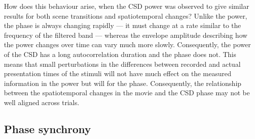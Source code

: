 How does this behaviour arise, when the \ac{CSD} power was observed to give similar results for both scene transitions and spatiotemporal changes?
Unlike the power, the phase is always changing rapidly --- it must change at a rate similar to the frequency of the filtered band --- whereas the envelope amplitude describing how the power changes over time can vary much more slowly.
Consequently, the power of the \ac{CSD} has a long autocorrelation duration and the phase does not.
This means that small perturbations in the differences between recorded and actual presentation times of the stimuli will not have much effect on the measured information in the power but will for the phase.
Consequently, the relationship between the spatiotemporal changes in the movie and the \ac{CSD} phase may not be well aligned across trials.


\subsection{Phase synchrony}



